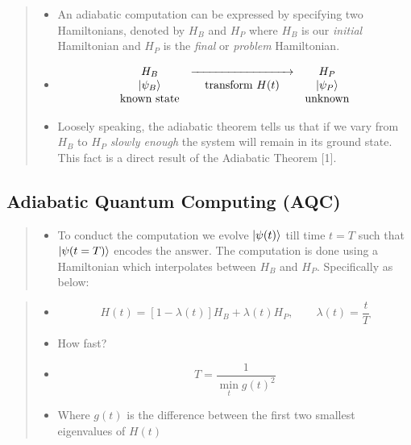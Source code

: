\documentclass[
]{article}
\providecommand{\tightlist}{%
  \setlength{\itemsep}{0pt}\setlength{\parskip}{0pt}}
\begin{document}
\begin{quote}
\begin{itemize}
\tightlist
\item
  An adiabatic computation can be expressed by specifying two
  Hamiltonians, denoted by \(H_B\) and \(H_P\) where \(H_B\) is our
  \emph{initial} Hamiltonian and \(H_P\) is the \emph{final} or
  \emph{problem} Hamiltonian.
\item
  \[\begin{matrix}
  H_B &  \xrightarrow{\hspace*{3cm}} & H_P \\
  \ket{\psi_B} &  \text{transform } H(t) &  \ket{\psi_P} \\
  \text{known state} &  &  \text{unknown}
  \end{matrix}
  \]
\item
  Loosely speaking, the adiabatic theorem tells us that if we vary from
  \(H_B\) to \(H_P\) \emph{slowly enough} the system will remain in its
  ground state. This fact is a direct result of the Adiabatic Theorem
  {[}1{]}.
\end{itemize}
\end{quote}

\hypertarget{adiabatic-quantum-computing-aqc-3}{%
\subsection{Adiabatic Quantum Computing
(AQC)}\label{adiabatic-quantum-computing-aqc-3}}

\begin{quote}
\begin{itemize}
\tightlist
\item
  To conduct the computation we evolve \(\ket{\psi(t)}\) till time
  \(t=T\) such that \(\ket{\psi(t=T)}\) encodes the answer. The
  computation is done using a Hamiltonian which interpolates between
  \(H_B\) and \(H_P\). Specifically as below:
\end{itemize}
\end{quote}

\begin{quote}
\begin{itemize}
\tightlist
\item
  \[
  H(t) = \left[1 - \lambda(t)\right]H_B + \lambda(t)H_P, \qquad \lambda (t) = \frac{t}{T}
  \]
\item
  How fast?
\item
  \[
  T =  \frac{1}{\min_t  g(t)^2}
  \]
\item
  Where \(g(t)\) is the difference between the first two smallest
  eigenvalues of \(H(t)\)
\end{itemize}
\end{quote}
\end{document}
